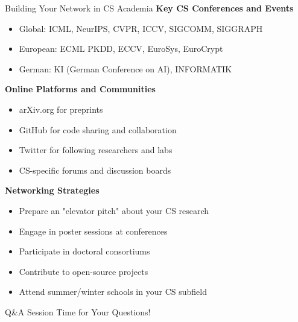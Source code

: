 \documentclass[aspectratio=169,10pt]{beamer}
\begin{document}
\begin{frame}{Building Your Network in CS Academia}
    \textbf{Key CS Conferences and Events}
    \begin{itemize}
        \item Global: ICML, NeurIPS, CVPR, ICCV, SIGCOMM, SIGGRAPH
        \item European: ECML PKDD, ECCV, EuroSys, EuroCrypt
        \item German: KI (German Conference on AI), INFORMATIK
    \end{itemize}
    
    \textbf{Online Platforms and Communities}
    \begin{itemize}
        \item arXiv.org for preprints
        \item GitHub for code sharing and collaboration
        \item Twitter for following researchers and labs
        \item CS-specific forums and discussion boards
    \end{itemize}
    
    \textbf{Networking Strategies}
    \begin{itemize}
        \item Prepare an "elevator pitch" about your CS research
        \item Engage in poster sessions at conferences
        \item Participate in doctoral consortiums
        \item Contribute to open-source projects
        \item Attend summer/winter schools in your CS subfield
    \end{itemize}
\end{frame}

\begin{frame}{Q\&A Session}
    \centering
    \large{Time for Your Questions!}
    
    \vspace{1cm}
    
\end{frame}
\end{document}
